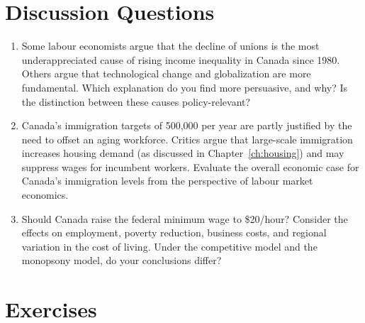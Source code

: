 \section*{Discussion Questions}

\begin{enumerate}

\item Some labour economists argue that the decline of unions is the most underappreciated cause of rising income inequality in Canada since 1980. Others argue that technological change and globalization are more fundamental. Which explanation do you find more persuasive, and why? Is the distinction between these causes policy-relevant?

\item Canada's immigration targets of 500,000 per year are partly justified by the need to offset an aging workforce. Critics argue that large-scale immigration increases housing demand (as discussed in Chapter~\ref{ch:housing}) and may suppress wages for incumbent workers. Evaluate the overall economic case for Canada's immigration levels from the perspective of labour market economics.

\item Should Canada raise the federal minimum wage to \$20/hour? Consider the effects on employment, poverty reduction, business costs, and regional variation in the cost of living. Under the competitive model and the monopsony model, do your conclusions differ?

\end{enumerate}

\section*{Exercises}

